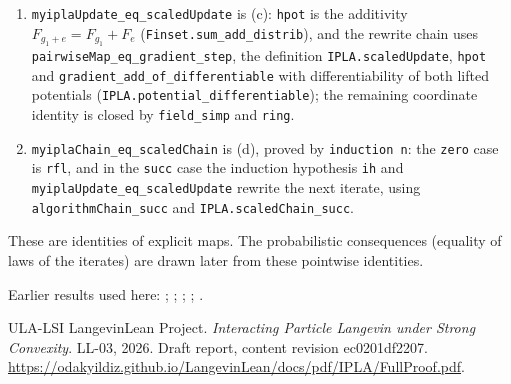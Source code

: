 \documentclass[11pt,a4paper]{article}
\begin{document}
\begin{leanbox}
\begin{enumerate}
\item \texttt{myipla\allowbreak{}Update\_\allowbreak{}eq\_\allowbreak{}scaled\allowbreak{}Update} is (c): \texttt{hpot} is the additivity \(F_{g_1+e}=F_{g_1}+F_e\) (\texttt{Finset.\allowbreak{}sum\_\allowbreak{}add\_\allowbreak{}distrib}), and the rewrite chain uses \texttt{pairwise\allowbreak{}Map\_\allowbreak{}eq\_\allowbreak{}gradient\_\allowbreak{}step}, the definition \texttt{IPLA.\allowbreak{}scaled\allowbreak{}Update}, \texttt{hpot} and \texttt{gradient\_\allowbreak{}add\_\allowbreak{}of\_\allowbreak{}differentiable} with differentiability of both lifted potentials (\texttt{IPLA.\allowbreak{}potential\_\allowbreak{}differentiable}); the remaining coordinate identity is closed by \texttt{field\_\allowbreak{}simp} and \texttt{ring}.

\item \texttt{myipla\allowbreak{}Chain\_\allowbreak{}eq\_\allowbreak{}scaled\allowbreak{}Chain} is (d), proved by \texttt{induction n}: the \texttt{zero} case is \texttt{rfl}, and in the \texttt{succ} case the induction hypothesis \texttt{ih} and \texttt{myipla\allowbreak{}Update\_\allowbreak{}eq\_\allowbreak{}scaled\allowbreak{}Update} rewrite the next iterate, using \texttt{algorithm\allowbreak{}Chain\_\allowbreak{}succ} and \texttt{IPLA.\allowbreak{}scaled\allowbreak{}Chain\_\allowbreak{}succ}.

\end{enumerate}



These are identities of explicit maps. The probabilistic consequences (equality of laws of the iterates) are drawn later from these pointwise identities.
\end{leanbox}


Earlier results used here: \cite[Section~3.1.1]{LangevinLean2026IPLA}; \cite[Section~3.1.3]{LangevinLean2026IPLA}; \cite[Section~3.1.5]{LangevinLean2026IPLA}; \cite[Section~3.1.7]{LangevinLean2026IPLA}; \cite[Section~3.4.2]{LangevinLean2026IPLA}.

\begin{thebibliography}{ULA-LSI}
LangevinLean Project. \emph{Interacting Particle Langevin under Strong Convexity}. LL-03, 2026. Draft report, content revision ec0201df2207. \url{https://odakyildiz.github.io/LangevinLean/docs/pdf/IPLA/FullProof.pdf}.
\end{thebibliography}
\end{document}
